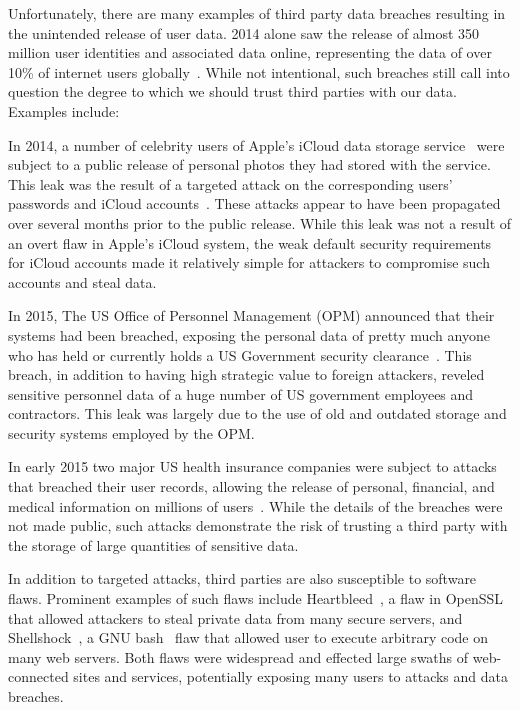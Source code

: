 Unfortunately, there are many examples of third party data breaches
resulting in the unintended release of user data. 2014 alone saw the
release of almost 350 million user identities and associated data
online, representing the data of over 10\% of internet users
globally~\cite{symanteccorporation2015}. While not intentional, such
breaches still call into question the degree to which we should trust
third parties with our data. Examples include:

\begin{packed_desc}
\item[Apple iCloud Celebrity Photo Leak:] In 2014, a number of
  celebrity users of Apple's iCloud data storage
  service~\cite{apple-icloud} were subject to a public release of
  personal photos they had stored with the service. This leak was the
  result of a targeted attack on the corresponding users' passwords
  and iCloud accounts~\cite{apple-icloudleak}. These attacks appear to
  have been propagated over several months prior to the public
  release. While this leak was not a result of an overt flaw in
  Apple's iCloud system, the weak default security requirements for
  iCloud accounts made it relatively simple for attackers to
  compromise such accounts and steal data.
\item[Office of Personnel Management Breach:] In 2015, The US Office
  of Personnel Management (OPM) announced that their systems had been
  breached, exposing the personal data of pretty much anyone who has
  held or currently holds a US Government security
  clearance~\cite{ars-opmhack, opm-cybersecurityincidents}. This
  breach, in addition to having high strategic value to foreign
  attackers, reveled sensitive personnel data of a huge number of US
  government employees and contractors. This leak was largely due to
  the use of old and outdated storage and security systems employed by
  the OPM.
\item[Anthem and Premera Blue Cross Breaches:] In early 2015 two major
  US health insurance companies were subject to attacks that breached
  their user records, allowing the release of personal, financial, and
  medical information on millions of users~\cite{krebs-anthem,
    krebs-premera}. While the details of the breaches were not made
  public, such attacks demonstrate the risk of trusting a third party
  with the storage of large quantities of sensitive data.
\item[Heartbleed, Shellshock, Etc:] In addition to targeted attacks,
  third parties are also susceptible to software flaws. Prominent
  examples of such flaws include Heartbleed~\cite{heartbleed}, a flaw
  in OpenSSL~\cite{openssl} that allowed attackers to steal private
  data from many secure servers, and
  Shellshock~\cite{symantec-shellshock}, a GNU bash~\cite{gnu-bash}
  flaw that allowed user to execute arbitrary code on many web
  servers. Both flaws were widespread and effected large swaths of
  web-connected sites and services, potentially exposing many users to
  attacks and data breaches.
\end{packed_desc}


